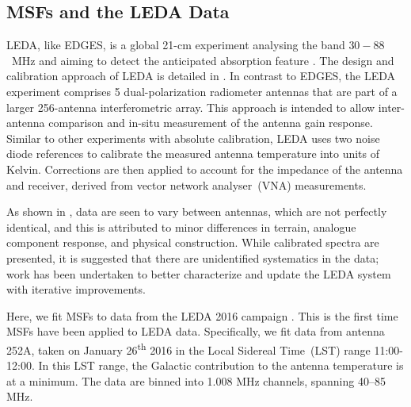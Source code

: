 \subsection{MSFs and the LEDA Data}
\label{sec:LEDA_fits}

LEDA, like EDGES, is a global 21-cm experiment analysing the band $30 - 88$~MHz and aiming to detect the anticipated absorption feature \cite{Greenhill2012}. The design and calibration approach of LEDA is detailed in \cite{Price_LEDA_2018}. In contrast to EDGES, the LEDA experiment comprises 5 dual-polarization radiometer antennas that are part of a larger 256-antenna interferometric array. This approach is intended to allow inter-antenna comparison and in-situ measurement of the antenna gain response. Similar to other experiments with absolute calibration, LEDA uses two noise diode references to calibrate the measured antenna temperature into units of Kelvin. Corrections are then applied to account for the impedance of the antenna and receiver, derived from vector network analyser~(VNA) measurements. 

As shown in \cite{Price_LEDA_2018}, data are seen to vary between antennas, which are not perfectly identical, and this is attributed to minor differences in terrain, analogue component response, and physical construction. While calibrated spectra are presented, it is suggested that there are unidentified systematics in the data; work has been undertaken to better characterize and update the LEDA system with iterative improvements. %

Here, we fit MSFs to data from the LEDA 2016 campaign \cite{Price_LEDA_2018}. This is the first time MSFs have been applied to LEDA data. Specifically, we fit data from antenna 252A, taken on January 26\textsuperscript{th} 2016 in the Local Sidereal Time~(LST) range 11:00-12:00.  In this LST range, the Galactic contribution to the antenna temperature is at a minimum. The data are binned into 1.008 MHz channels, spanning 40--85 MHz.

